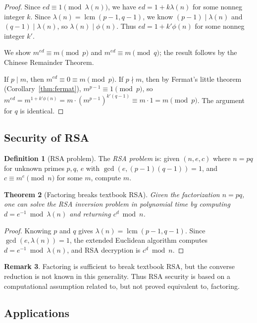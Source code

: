 \documentclass[twoside,12pt]{book}
\theoremstyle{plain}
\newtheorem{theorem}{Theorem}[chapter]
\theoremstyle{definition}
\newtheorem{definition}[theorem]{Definition}
\newtheorem{remark}[theorem]{Remark}
\theoremstyle{remark}
\begin{document}
\begin{proof}
Since $ed \equiv 1 \pmod{\lambda(n)}$, we have $ed = 1 + k\lambda(n)$ for some nonneg integer $k$. Since $\lambda(n) = \operatorname{lcm}(p-1, q-1)$, we know $(p-1) \mid \lambda(n)$ and $(q-1) \mid \lambda(n)$, so $\lambda(n) \mid \phi(n)$. Thus $ed = 1 + k'\phi(n)$ for some nonneg integer $k'$.

We show $m^{ed} \equiv m \pmod{p}$ and $m^{ed} \equiv m \pmod{q}$; the result follows by the Chinese Remainder Theorem.

If $p \mid m$, then $m^{ed} \equiv 0 \equiv m \pmod{p}$. If $p \nmid m$, then by Fermat's little theorem (Corollary~\ref{thm:fermat}), $m^{p-1} \equiv 1 \pmod{p}$, so $m^{ed} = m^{1+k'\phi(n)} = m \cdot (m^{p-1})^{k'(q-1)} \equiv m \cdot 1 = m \pmod{p}$. The argument for $q$ is identical.
\end{proof}

\subsection{Security of RSA}

\begin{definition}[RSA problem]
The \emph{RSA problem} is: given $(n, e, c)$ where $n = pq$ for unknown primes $p, q$, $e$ with $\gcd(e, (p-1)(q-1)) = 1$, and $c \equiv m^e \pmod{n}$ for some $m$, compute $m$.
\end{definition}

\begin{theorem}[Factoring breaks textbook RSA]
\label{thm:rsa-factoring}
Given the factorization $n=pq$, one can solve the RSA inversion problem in
polynomial time by computing $d=e^{-1}\bmod\lambda(n)$ and returning
$c^d\bmod n$.
\end{theorem}

\begin{proof}
Knowing $p$ and $q$ gives $\lambda(n)=\operatorname{lcm}(p-1,q-1)$.
Since $\gcd(e,\lambda(n))=1$, the extended Euclidean algorithm computes
$d=e^{-1}\bmod\lambda(n)$, and RSA decryption is $c^d\bmod n$.
\end{proof}

\begin{remark}
Factoring is sufficient to break textbook RSA, but the converse reduction is
not known in this generality. Thus RSA security is based on a computational
assumption related to, but not proved equivalent to, factoring.
\end{remark}

\subsection{Applications}
\end{document}
